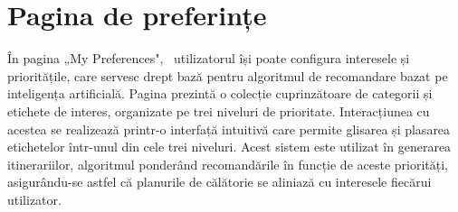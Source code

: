 \section{Pagina de preferințe}
În pagina „My Preferences",  utilizatorul își poate configura interesele și prioritățile, care servesc drept bază pentru algoritmul de recomandare bazat pe inteligența artificială. Pagina prezintă o colecție cuprinzătoare de categorii și etichete de interes, organizate pe trei niveluri de prioritate. Interacțiunea cu acestea se realizează printr-o interfață intuitivă care permite glisarea și plasarea etichetelor într-unul din cele trei niveluri. Acest sistem este utilizat în generarea itinerariilor, algoritmul ponderând recomandările în funcție de aceste priorități, asigurându-se astfel că planurile de călătorie se aliniază cu interesele fiecărui utilizator.